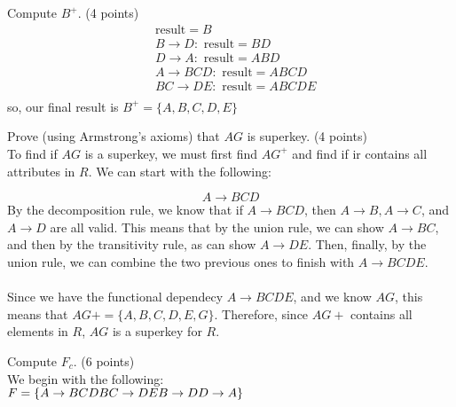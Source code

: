 \documentclass[a4 paper]{article}
\begin{document}
 Compute $B^{+}$. \indent (4 points)\\
\begin{align*}
  &\text{result} = B\\
  &B\rightarrow D: \text{ result} = BD\\
  &D\rightarrow A: \text{ result} = ABD\\
  &A\rightarrow BCD: \text{ result} = ABCD\\
  &BC\rightarrow DE: \text{ result} = ABCDE\\
\end{align*}
so, our final result is $B^+=\{A,B,C,D,E\}$




 Prove (using Armstrong's axioms) that $AG$ is superkey. \indent (4 points)\\
To find if $AG$ is a superkey, we must first find $AG^+$ and find if ir contains all attributes in $R$. We can start with the following:

$$A\rightarrow BCD$$
By the decomposition rule, we know that if $A\rightarrow BCD$, then $A\rightarrow B, A\rightarrow C$, and $A\rightarrow D$ are all valid. This means that by the union rule, we can show $A\rightarrow BC$, and then by the transitivity rule, as can show $A\rightarrow DE$. Then, finally, by the union rule, we can combine the two previous ones to finish with $A\rightarrow BCDE$.\\\\
Since we have the functional dependecy $A\rightarrow BCDE$, and we know $AG$, this means that $AG+=\{A, B, C, D, E, G\}$. Therefore, since $AG+$ contains all elements in $R$, $AG$ is a superkey for $R$.

 Compute $F_{c}$. \indent (6 points)\\

We begin with the following:\\
$F=\{\\
A \rightarrow BCD\\
BC \rightarrow DE\\
B \rightarrow D\\
D \rightarrow A\}$\\
\end{document}
